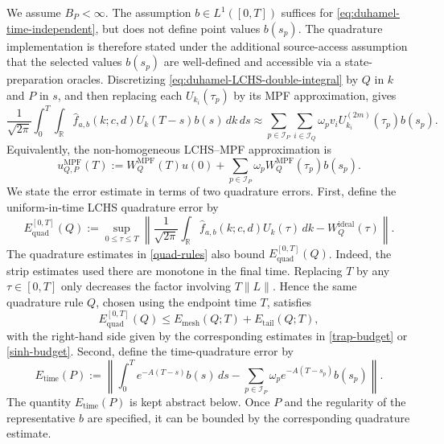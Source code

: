 \documentclass[10pt,reqno]{article}
\numberwithin{equation}{section}
\theoremstyle{plain}
\theoremstyle{definition}
\begin{document}
We assume \(B_P<\infty\). The assumption \(b\in L^1([0,T])\) suffices for \cref{eq:duhamel-time-independent}, but does not define point values \(b(s_p)\). The quadrature implementation is therefore stated under the additional source-access assumption that the selected values \(b(s_p)\) are well-defined and accessible via a state-preparation oracles.   Discretizing \cref{eq:duhamel-LCHS-double-integral} by \(Q\) in \(k\) and \(P\) in \(s\), and then replacing each \(U_{k_i}(\tau_p)\) by its MPF approximation, gives
\begin{equation}\label{eq:duhamel-LCHS-MPF-double-sum}
\frac{1}{\sqrt{2\pi}}\int_0^T\int_{\mathbb R}\hat f_{a,b}(k;c,d)U_k(T-s)b(s)\,dk\,ds \approx \sum_{p\in\mathcal I_P}\sum_{i\in\mathcal I_Q}\omega_p v_iU^{(2m)}_{k_i}(\tau_p)b(s_p).
\end{equation}
Equivalently, the non-homogeneous LCHS--MPF approximation is
\begin{equation}\label{eq:non-homogeneous-LCHS-MPF-approx}
u_{Q,P}^{\operatorname{MPF}}(T):=W_Q^{\operatorname{MPF}}(T)u(0)+\sum_{p\in\mathcal I_P}\omega_pW_Q^{\operatorname{MPF}}(\tau_p)b(s_p).
\end{equation}
We state the error estimate in terms of two quadrature errors. First, define the uniform-in-time LCHS quadrature error by
\begin{equation}\label{eq:uniform-quadrature-error}
E_{\operatorname{quad}}^{[0,T]}(Q):=\sup_{0\leq \tau\leq T}\left\|\frac{1}{\sqrt{2\pi}}\int_{\mathbb R}\hat f_{a,b}(k;c,d)U_k(\tau)\,dk-W_Q^{\operatorname{ideal}}(\tau)\right\|.
\end{equation}
The quadrature estimates in \cref{quad-rules} also bound \(E_{\operatorname{quad}}^{[0,T]}(Q)\). Indeed, the strip estimates used there are monotone in the final time. Replacing \(T\) by any \(\tau\in[0,T]\) only decreases the factor involving \(T\|L\|\). Hence the same quadrature rule \(Q\), chosen using the endpoint time \(T\), satisfies
\begin{equation}
E_{\operatorname{quad}}^{[0,T]}(Q)\le E_{\operatorname{mesh}}(Q;T)+E_{\operatorname{tail}}(Q;T),
\end{equation}
with the right-hand side given by the corresponding estimates in \cref{trap-budget} or \cref{sinh-budget}. Second, define the time-quadrature error by
\begin{equation}\label{eq:time-quadrature-error}
E_{\operatorname{time}}(P):=\left\|\int_0^T e^{-A(T-s)}b(s)\,ds-\sum_{p\in\mathcal I_P}\omega_p e^{-A(T-s_p)}b(s_p)\right\|.
\end{equation}
The quantity \(E_{\operatorname{time}}(P)\) is kept abstract below. Once \(P\) and the regularity of the representative \(b\) are specified, it can be bounded by the corresponding quadrature estimate.
\end{document}
